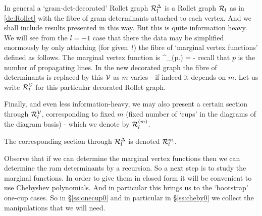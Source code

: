 In general a `gram-det-decorated' Rollet graph 
${\mathcal{R}}^{{\Delta}}_l$ 
is a Rollet graph ${\mathcal{R}}_l$ 
as in \ref{de:Rollet}
with the fibre of gram determinants attached to each vertex. 
And we shall include results presented in this way.
But this is quite information heavy. 
We will see from the $l=-1$ case that there the data may be simplified enormously by only attaching (for given~$l$)
the fibre of `marginal vertex functions' defined as follows. 
The marginal vertex function is 
%
\beq  \label{eq:MVF1}
\V^{}_{(p.\lambda)} \; \bajmm{:}= \; 
\eq 
- recall that $p$ is the number of propagating lines.  
In the new decorated graph the fibre of determinants is replaced by this ${\mathcal V}$ as $m$ varies - if indeed it depends on $m$.
Let us write ${\mathcal{R}}^{{\mathcal V}}_l$ for this particular decorated Rollet graph. 

\mdef   \label{de:Roll-etc}
Finally, and even less information-heavy, we may also present a certain section through ${\mathcal{R}}^{{\mathcal V}}_l$,
corresponding to fixed $m$ 
(fixed number of `cups' in the diagrams of the diagram basis) - which we denote by ${\mathcal{R}}^{(m)}_l$.

The corresponding section through ${\mathcal{R}}^{{\Delta}}_l$ is denoted ${\mathcal{R}}^{m}_l$. 

\medskip 

Observe that if we can determine the marginal vertex functions then we can determine the ram determinants by a recursion. %
So a next step is to study the marginal functions. 
In order to give them in closed form it will be convenient to use Chebyshev polynomials. 
And in particular this brings us to the `bootstrap' one-cup cases. 
So in 
\S\ref{ss:onecup0} and in particular in 
\S\ref{ss:cheby0} we collect the manipulations that we will need. 

